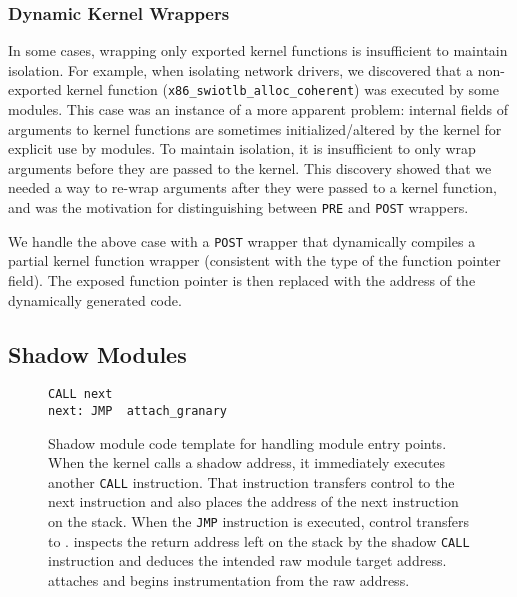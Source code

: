 \documentclass[10pt,preprint]{sigplanconf}
\begin{document}
\subsubsection{Dynamic Kernel Wrappers \label{sec:dynamic_wrapper}}
In some cases, wrapping only exported kernel functions is insufficient to maintain isolation. For example, when isolating network drivers, we discovered that a non-exported kernel function (\texttt{x86\_\linebreak[0]swiotlb\_\linebreak[0]alloc\_\linebreak[0]coherent}) was executed by some modules. This case was an instance of a more apparent problem: internal fields of arguments to kernel functions are sometimes initialized/altered by the kernel for explicit use by modules. To maintain isolation, it is insufficient to only wrap arguments before they are passed to the kernel. This discovery showed that we needed a way to re-wrap arguments after they were passed to a kernel function, and was the motivation for distinguishing between \texttt{PRE} and \texttt{POST} wrappers. 

We handle the above case with a \texttt{POST} wrapper that dynamically compiles a partial kernel function wrapper (consistent with the type of the function pointer field). The exposed function pointer is then replaced with the address of the dynamically generated code.


\subsection{Shadow Modules \label{sec:shadow_module}}

\begin{figure}
\begin{lstlisting}[basicstyle=\footnotesize\ttfamily]
      CALL next
next: JMP  attach_granary
\end{lstlisting}
\caption[LoF entry]{Shadow module code template for handling module entry points. When the kernel calls a shadow address, it immediately executes another \texttt{CALL} instruction. That instruction transfers control to the next instruction and also places the address of the next instruction on the stack. When the \texttt{JMP} instruction is executed, control transfers to {\sysname}. {\Sysname} inspects the return address left on the stack by the shadow \texttt{CALL} instruction and deduces the intended raw module target address. {\Sysname} attaches and begins instrumentation from the raw address.}
\label{fig:shadow_template}
\end{figure}
\end{document}
